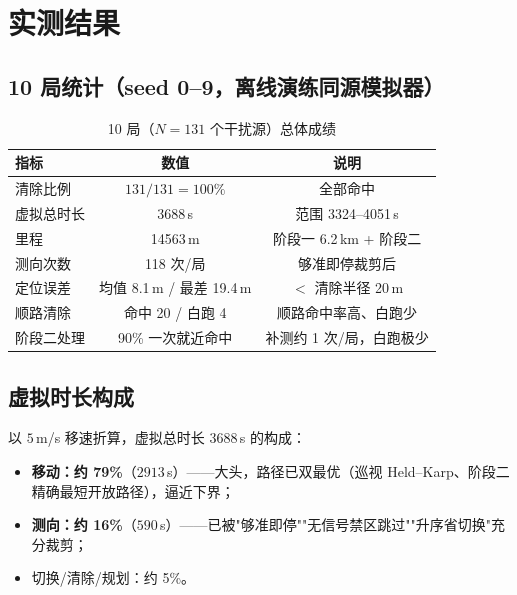 \documentclass[a4paper,11pt]{ctexart}
\begin{document}
\section{实测结果}
\subsection{10 局统计（seed 0--9，离线演练同源模拟器）}
\begin{table}[H]
  \centering
  \caption{10 局（$N=131$ 个干扰源）总体成绩}
  \label{tab:main}
  \begin{tabular}{lcc}
    \toprule
    指标 & 数值 & 说明 \\
    \midrule
    清除比例 & $131/131=100\%$ & 全部命中 \\
    虚拟总时长 & 3688\,s & 范围 3324--4051\,s \\
    里程 & 14563\,m & 阶段一 6.2\,km + 阶段二 \\
    测向次数 & 118 次/局 & 够准即停裁剪后 \\
    定位误差 & 均值 8.1\,m / 最差 19.4\,m & $<$ 清除半径 20\,m \\
    顺路清除 & 命中 20 / 白跑 4 & 顺路命中率高、白跑少 \\
    阶段二处理 & 90\% 一次就近命中 & 补测约 1 次/局，白跑极少 \\
    \bottomrule
  \end{tabular}
\end{table}

\subsection{虚拟时长构成}
以 $5$\,m/s 移速折算，虚拟总时长 $3688$\,s 的构成：
\begin{itemize}
  \item \textbf{移动：约 79\%}（$2913$\,s）——大头，路径已双最优（巡视 Held--Karp、阶段二
        精确最短开放路径），逼近下界；
  \item \textbf{测向：约 16\%}（$590$\,s）——已被"够准即停""无信号禁区跳过""升序省切换"充分裁剪；
  \item 切换/清除/规划：约 5\%。
\end{itemize}
\end{document}
